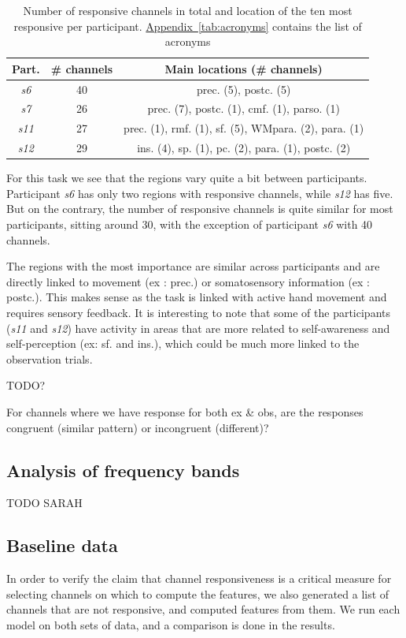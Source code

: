 \documentclass[10pt,conference,compsocconf]{IEEEtran}
\newcommand{\aref}[1]{\hyperref[#1]{Appendix~\ref*{#1}}}
\begin{document}
\begin{table}[h!]
    \centering
    \begin{tabular}{| c | c | c |}
        \hline
        Part. & \# channels & Main locations (\# channels) \\
        \hline
        \textit{s6} & 40 & prec. (5), postc. (5) \\
        \hline
        \textit{s7} & 26 & prec. (7), postc. (1), cmf. (1), parso. (1) \\
        \hline
        \textit{s11} & 27 & prec. (1),  rmf. (1), sf. (5), WMpara. (2), para. (1) \\
        \hline
        \textit{s12} & 29 & ins. (4), sp. (1), pc. (2), para. (1), postc. (2) \\
        \hline
    \end{tabular}
    \caption{Number of responsive channels in total and location of the ten most responsive per participant. \aref{tab:acronyms} contains the list of acronyms}
    \label{tab:actionrecogchannellocations}
\end{table}

For this task we see that the regions vary quite a bit between participants. Participant \textit{s6} has only two regions with responsive channels, while \textit{s12} has five. But on the contrary, the number of responsive channels is quite similar for most participants, sitting around 30, with the exception of participant \textit{s6} with 40 channels.

The regions with the most importance are similar across participants and are directly linked to movement (ex : prec.) or somatosensory information (ex : postc.). This makes sense as the task is linked with active hand movement and requires sensory feedback. It is interesting to note that some of the participants (\textit{s11} and \textit{s12}) have activity in areas that are more related to self-awareness and self-perception (ex: sf. and ins.), which could be much more linked to the observation trials.

TODO?

For channels where we have response for both ex \& obs, are the responses congruent (similar pattern) or incongruent (different)?

\subsection{Analysis of frequency bands}
TODO SARAH

\subsection{Baseline data}
In order to verify the claim that channel responsiveness is a critical measure for selecting channels on which to compute the features, we also generated a list of channels that are not responsive, and computed features from them. We run each model on both sets of data, and a comparison is done in the results.
\end{document}
